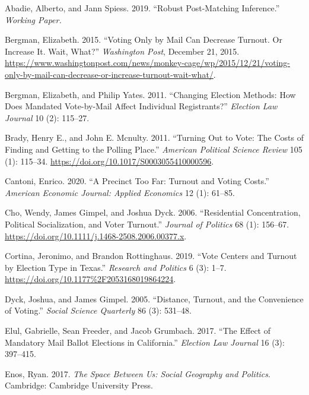 \documentclass[
  12pt,
]{article}
\newlength{\cslhangindent}
\newenvironment{cslreferences}%
  {\setlength{\parindent}{0pt}%
  \everypar{\setlength{\hangindent}{\cslhangindent}}\ignorespaces}%
  {\par}
\begin{document}
\hypertarget{refs}{}
\begin{cslreferences}
\leavevmode\hypertarget{ref-Abadie2019}{}%
Abadie, Alberto, and Jann Spiess. 2019. ``Robust Post-Matching Inference.'' \emph{Working Paper.}

\leavevmode\hypertarget{ref-Bergman2015}{}%
Bergman, Elizabeth. 2015. ``Voting Only by Mail Can Decrease Turnout. Or Increase It. Wait, What?'' \emph{Washington Post}, December 21, 2015. \url{https://www.washingtonpost.com/news/monkey-cage/wp/2015/12/21/voting-only-by-mail-can-decrease-or-increase-turnout-wait-what/}.

\leavevmode\hypertarget{ref-Bergman2011}{}%
Bergman, Elizabeth, and Philip Yates. 2011. ``Changing Election Methods: How Does Mandated Vote-by-Mail Affect Individual Registrants?'' \emph{Election Law Journal} 10 (2): 115--27.

\leavevmode\hypertarget{ref-Brady2011}{}%
Brady, Henry E., and John E. Mcnulty. 2011. ``Turning Out to Vote: The Costs of Finding and Getting to the Polling Place.'' \emph{American Political Science Review} 105 (1): 115--34. \url{https://doi.org/10.1017/S0003055410000596}.

\leavevmode\hypertarget{ref-Cantoni2020}{}%
Cantoni, Enrico. 2020. ``A Precinct Too Far: Turnout and Voting Costs.'' \emph{American Economic Journal: Applied Economics} 12 (1): 61--85.

\leavevmode\hypertarget{ref-Cho2006}{}%
Cho, Wendy, James Gimpel, and Joshua Dyck. 2006. ``Residential Concentration, Political Socialization, and Voter Turnout.'' \emph{Journal of Politics} 68 (1): 156--67. \url{https://doi.org/10.1111/j.1468-2508.2006.00377.x}.

\leavevmode\hypertarget{ref-Cortina2019}{}%
Cortina, Jeronimo, and Brandon Rottinghaus. 2019. ``Vote Centers and Turnout by Election Type in Texas.'' \emph{Research and Politics} 6 (3): 1--7. \url{https://doi.org/10.1177\%2F2053168019864224}.

\leavevmode\hypertarget{ref-Dyck2005}{}%
Dyck, Joshua, and James Gimpel. 2005. ``Distance, Turnout, and the Convenience of Voting.'' \emph{Social Science Quarterly} 86 (3): 531--48.

\leavevmode\hypertarget{ref-Elul2017}{}%
Elul, Gabrielle, Sean Freeder, and Jacob Grumbach. 2017. ``The Effect of Mandatory Mail Ballot Elections in California.'' \emph{Election Law Journal} 16 (3): 397--415.

\leavevmode\hypertarget{ref-Enos2017}{}%
Enos, Ryan. 2017. \emph{The Space Between Us: Social Geography and Politics}. Cambridge: Cambridge University Press.


\end{cslreferences}
\end{document}

